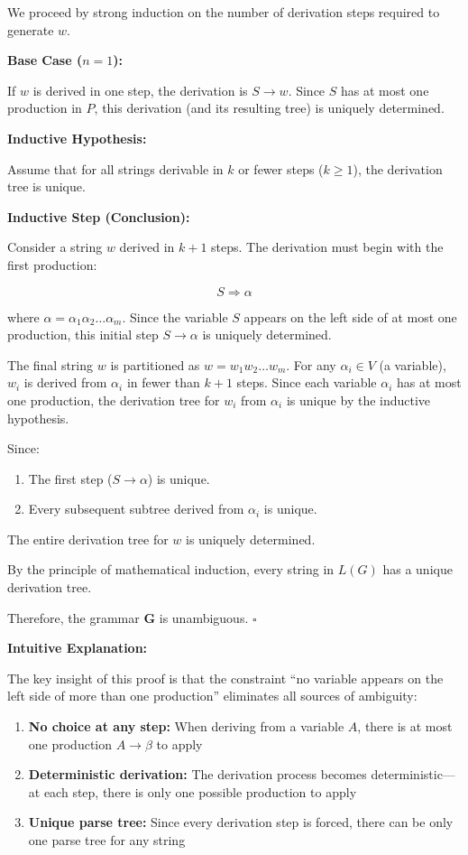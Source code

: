 \documentclass[12pt]{article}
\begin{document}
We proceed by strong induction on the number of derivation steps required to generate $w$.

\textbf{Base Case ($n = 1$):}

If $w$ is derived in one step, the derivation is $S \rightarrow w$. Since $S$ has at most one production in $P$, this derivation (and its resulting tree) is uniquely determined.

\textbf{Inductive Hypothesis:}

Assume that for all strings derivable in $k$ or fewer steps ($k \ge 1$), the derivation tree is unique.

\textbf{Inductive Step (Conclusion):}

Consider a string $w$ derived in $k + 1$ steps. The derivation must begin with the first production:

$$S \Rightarrow \alpha$$

where $\alpha = \alpha_1 \alpha_2 \dots \alpha_m$. Since the variable $S$ appears on the left side of at most one production, this initial step $S \rightarrow \alpha$ is uniquely determined.

The final string $w$ is partitioned as $w = w_1 w_2 \dots w_m$. For any $\alpha_i \in V$ (a variable), $w_i$ is derived from $\alpha_i$ in fewer than $k+1$ steps. Since each variable $\alpha_i$ has at most one production, the derivation tree for $w_i$ from $\alpha_i$ is unique by the inductive hypothesis.

Since:
\begin{enumerate}
\item The first step ($S \rightarrow \alpha$) is unique.
\item Every subsequent subtree derived from $\alpha_i$ is unique.
\end{enumerate}

The entire derivation tree for $w$ is uniquely determined.

By the principle of mathematical induction, every string in $L(G)$ has a unique derivation tree.

Therefore, the grammar $\mathbf{G}$ is unambiguous. $\square$

\textbf{Intuitive Explanation:}

The key insight of this proof is that the constraint ``no variable appears on the left side of more than one production'' eliminates all sources of ambiguity:

\begin{enumerate}
\item \textbf{No choice at any step:} When deriving from a variable $A$, there is at most one production $A \rightarrow \beta$ to apply
\item \textbf{Deterministic derivation:} The derivation process becomes deterministic---at each step, there is only one possible production to apply
\item \textbf{Unique parse tree:} Since every derivation step is forced, there can be only one parse tree for any string
\end{enumerate}
\end{document}
